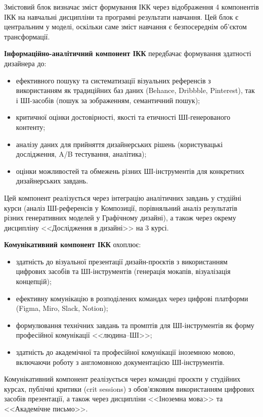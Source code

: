 Змістовий блок визначає зміст формування ІКК через відображення 4 компонентів ІКК на навчальні дисципліни та програмні результати навчання. Цей блок є центральним у моделі, оскільки саме зміст навчання є безпосереднім об'єктом трансформації.

\textbf{Інформаційно-аналітичний компонент ІКК} передбачає формування здатності дизайнера до:
\begin{itemize}
    \item ефективного пошуку та систематизації візуальних референсів з використанням як традиційних баз даних (Behance, Dribbble, Pinterest), так і ШІ-засобів (пошук за зображенням, семантичний пошук);
    \item критичної оцінки достовірності, якості та етичності ШІ-генерованого контенту;
    \item аналізу даних для прийняття дизайнерських рішень (користувацькі дослідження, A/B тестування, аналітика);
    \item оцінки можливостей та обмежень різних ШІ-інструментів для конкретних дизайнерських завдань.
\end{itemize}

Цей компонент реалізується через інтеграцію аналітичних завдань у студійні курси (аналіз ШІ-референсів у Композиції, порівняльний аналіз результатів різних генеративних моделей у Графічному дизайні), а також через окрему дисципліну <<Дослідження в дизайні>> на 3 курсі.

\textbf{Комунікативний компонент ІКК} охоплює:
\begin{itemize}
    \item здатність до візуальної презентації дизайн-проєктів з використанням цифрових засобів та ШІ-інструментів (генерація мокапів, візуалізація концепцій);
    \item ефективну комунікацію в розподілених командах через цифрові платформи (Figma, Miro, Slack, Notion);
    \item формулювання технічних завдань та промптів для ШІ-інструментів як форму професійної комунікації <<людина--ШІ>>;
    \item здатність до академічної та професійної комунікації іноземною мовою, включаючи роботу з англомовною документацією ШІ-інструментів.
\end{itemize}

Комунікативний компонент реалізується через командні проєкти у студійних курсах, публічні критики (crit sessions) з обов'язковим використанням цифрових засобів презентації, а також через дисципліни <<Іноземна мова>> та <<Академічне письмо>>.

